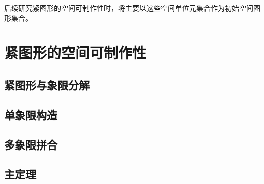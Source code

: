 \documentclass[UTF8,fontset=none]{ctexart}
\theoremstyle{cnthm}
\begin{document}
			后续研究紧图形的空间可制作性时，将主要以这些空间单位元集合作为初始空间图形集合。
			
	\newpage
	
	\section{紧图形的空间可制作性}
		\subsection{紧图形与象限分解}
		\subsection{单象限构造}
		\subsection{多象限拼合}
		\subsection{主定理}
			
\end{document}
